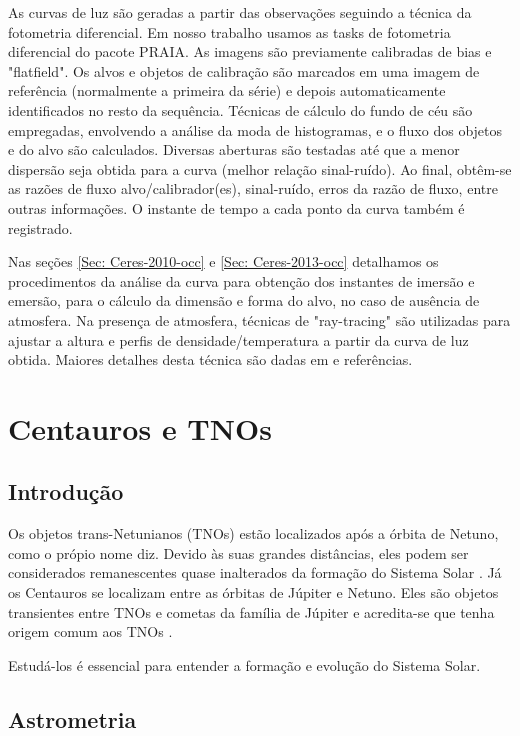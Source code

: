 \documentclass[12pt,a4paper]{monografia}
\begin{document}
As curvas de luz são geradas a partir das observações seguindo a técnica da fotometria diferencial. Em nosso trabalho usamos as tasks de fotometria diferencial do pacote PRAIA. As imagens são previamente calibradas de bias e "flatfield". Os alvos e objetos de calibração são marcados em uma imagem de referência (normalmente a primeira da série) e depois automaticamente identificados no resto da sequência. Técnicas de cálculo do fundo de céu são empregadas, envolvendo a análise da moda de histogramas, e o fluxo dos objetos e do alvo são calculados. Diversas aberturas são testadas até que a menor dispersão seja obtida para a curva (melhor relação sinal-ruído). Ao final, obtêm-se as razões de fluxo alvo/calibrador(es), sinal-ruído, erros da razão de fluxo, entre outras informações. O instante de tempo a cada ponto da curva também é registrado.

Nas seções \ref{Sec: Ceres-2010-occ} e \ref{Sec: Ceres-2013-occ} detalhamos os procedimentos da análise da curva para obtenção dos instantes de imersão e emersão, para o cálculo da dimensão e forma do alvo, no caso de ausência de atmosfera. Na presença de atmosfera, técnicas de "ray-tracing" são utilizadas para ajustar a altura e perfis de densidade/temperatura a partir da curva de luz obtida. Maiores detalhes desta técnica são dadas em \cite{DiasOliveira2015} e referências. 

\chapter{Centauros e TNOs}
\label{Cap: TNOs}

\section{Introdução}
\label{Sec: TNOs-intro}

\indent \indent Os objetos trans-Netunianos (TNOs) estão localizados após a órbita de Netuno, como o própio nome diz. Devido às suas grandes distâncias, eles podem ser considerados remanescentes quase inalterados da formação do Sistema Solar \cite{Assafin2012}. Já os Centauros se localizam entre as órbitas de Júpiter e Netuno. Eles são objetos transientes entre TNOs e cometas da família de Júpiter e acredita-se que tenha origem comum aos TNOs \citep{Camargo2013}.

Estudá-los é essencial para entender a formação e evolução do Sistema Solar.


\section{Astrometria}
\label{Sec: TNOs-astrometria}
\end{document}
